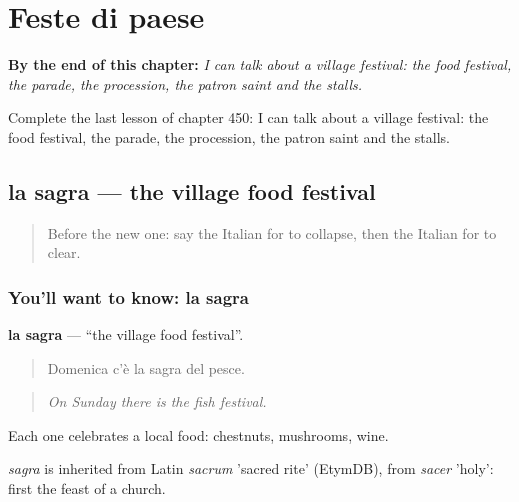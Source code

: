 
\chapter{Feste di paese}
\label{ch:it-feste-di-paese}

\begin{chapteropening}
\textbf{By the end of this chapter:} \emph{I can talk about a village festival: the food festival, the parade, the procession, the patron saint and the stalls.}

Complete the last lesson of chapter 450: I can talk about a village festival: the food festival, the parade, the procession, the patron saint and the stalls.
\end{chapteropening}

\section[la sagra]{la sagra — the village food festival}

\label{lesson:IT-C450-sagra}



\begin{quote}
Before the new one: say the Italian for to collapse, then the Italian for to clear.
\end{quote}

\subsection*{You'll want to know: la sagra}
\textbf{la sagra} — \textquotedblleft{}the village food festival\textquotedblright{}.

\begin{quote}
Domenica c'è la sagra del pesce.
\end{quote}

\begin{quote}
\emph{On Sunday there is the fish festival.}
\end{quote}

Each one celebrates a local food: chestnuts, mushrooms, wine.

\begin{cousinweb}
\emph{sagra} is inherited from Latin \emph{sacrum} 'sacred rite' (EtymDB), from \emph{sacer} 'holy': first the feast of a church.
\end{cousinweb}

